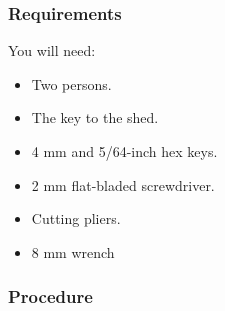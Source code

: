 \subsubsection{Requirements}

You will need:

\begin{itemize}
    \item Two persons.
    \item The key to the shed.
    \item 4 mm and 5/64-inch hex keys.
    \item 2 mm flat-bladed screwdriver.
    \item Cutting pliers.
    \item 8 mm wrench
\end{itemize}

\subsubsection{Procedure}

